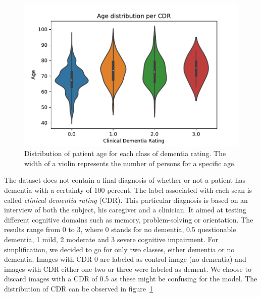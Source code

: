 \begin{figure}
 \centering
 \includegraphics[width=.9\linewidth]{figures/dataset/OASIS_age_dist_per_cdr.pdf}
 \captionsetup{width=.9\linewidth}
 \caption{Distribution of patient age for each class of dementia rating. The width of a violin represents the number of persons for a specific age.}
 \label{fig:OASIS_age_dist}
\end{figure}

The dataset does not contain a final diagnosis of whether or not a patient has dementia with a certainty of 100 percent. The label associated with each scan is called \textit{clinical dementia rating} (CDR)\footnotemark. This particular diagnosis is based on an interview of both the subject, his caregiver and a clinician. It aimed at testing different cognitive domains such as memory, problem-solving or orientation. The results range from 0 to 3, where 0 stands for no dementia, 0.5 questionable dementia, 1 mild, 2 moderate and 3 severe cognitive impairment. For simplification, we decided to go for only two classes, either dementia or no dementia. Images with CDR 0 are labeled as control image (no dementia) and images with CDR either one two or three were labeled as dement. We choose to discard images with a CDR of 0.5 as these might be confusing for the model. The distribution of CDR can be observed in figure~\ref{fig:OASIS_age_dist}

